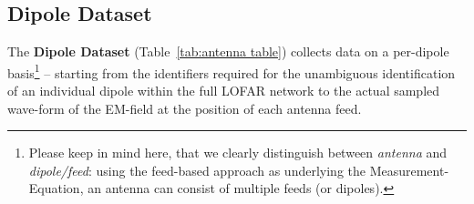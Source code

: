 \documentclass[a4paper,10pt,bibtotoc]{scrartcl}
\begin{document}
\clearpage



\subsection{Dipole Dataset}
\label{sec:dipole dataset}

The \textbf{Dipole Dataset} (Table~\ref{tab:antenna table}) collects data on
a per-dipole basis\footnote{Please keep in mind here, that we clearly
  distinguish between \textsl{antenna} and \textsl{dipole/feed}: using the
  feed-based approach as underlying the Measurement-Equation, an antenna can
  consist of multiple feeds (or dipoles).} -- starting from the identifiers
required for the unambiguous identification of an individual dipole within
the full LOFAR network to the actual sampled wave-form of the EM-field at the
position of each antenna feed.
\end{document}
